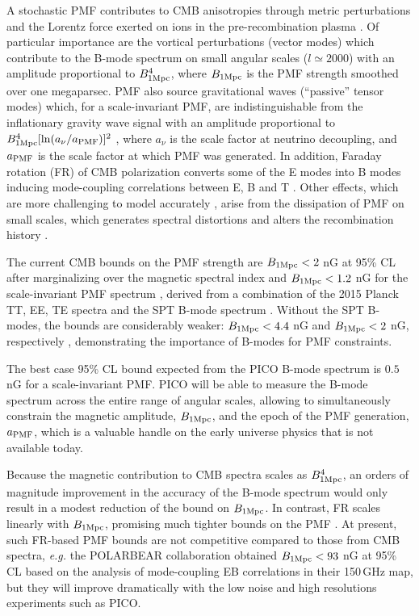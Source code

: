 \documentclass[article,aps,nofootinbib]{revtex4}
\begin{document}
A stochastic PMF contributes to CMB anisotropies through metric perturbations and the Lorentz force exerted on ions in the pre-recombination plasma \cite{Mack:2001gc,Lewis:2004ef,Finelli:2008xh,Paoletti:2008ck,Shaw:2009nf}. Of particular importance are the vortical perturbations (vector modes) which contribute to the B-mode spectrum \cite{Subramanian:1997gi} on small angular scales  ($l \simeq 2000$) with an amplitude proportional to $B^4_{1\rm{Mpc}}$, where $B_{1\rm{Mpc}}$ is the PMF strength smoothed over one megaparsec. PMF also source gravitational waves (``passive'' tensor modes) which, for a scale-invariant PMF, are indistinguishable from the inflationary gravity wave signal with an amplitude proportional to $B^4_{1\rm{Mpc}} [\ln(a_\nu / a_{\rm{PMF}})]^2$ \cite{Lewis:2004ef}, where $a_\nu$ is the scale factor at neutrino decoupling, and $a_{\rm{PMF}}$ is the scale factor at which PMF was generated. In addition, Faraday rotation (FR) of CMB polarization converts some of the E modes into B modes \cite{Kosowsky:1996yc,Pogosian:2011qv} inducing mode-coupling correlations between E, B and T \cite{Kamionkowski:2008fp,Gluscevic:2009mm,Gluscevic:2012me,Pogosian:2013dya}. Other effects, which are more challenging to model accurately \cite{Chluba:2015lpa}, arise from the dissipation of PMF on small scales, which generates spectral distortions and alters the recombination history \cite{Jedamzik:2013gua,Kunze:2014eka}.

The current CMB bounds on the PMF strength are $B_{\rm 1Mpc}<2$ nG at 95\% CL after marginalizing over the magnetic spectral index and $B_{\rm 1Mpc}<1.2$ nG for the scale-invariant PMF spectrum \cite{Zucca:2016iur}, derived from a combination of the 2015 Planck TT, EE, TE spectra \cite{Adam:2015rua} and the SPT B-mode spectrum \cite{Keisler:2015hfa}. Without the SPT B-modes, the bounds are considerably weaker: $B_{\rm 1Mpc}<4.4$ nG and $B_{\rm 1Mpc}<2$ nG, respectively \cite{Ade:2015cva,Zucca:2016iur}, demonstrating the importance of B-modes for PMF constraints.

The best case 95\% CL bound expected from the PICO B-mode spectrum is $0.5$ nG for a scale-invariant PMF. PICO will be able to measure the B-mode spectrum across the entire range of angular scales, allowing to simultaneously constrain the magnetic amplitude, $B_{1\rm{Mpc}}$, and the epoch of the PMF generation, $a_{\rm{PMF}}$, which is a valuable handle on the early universe physics that is not available today.

Because the magnetic contribution to CMB spectra scales as $B^4_{1\rm{Mpc}}$, an orders of magnitude improvement in the accuracy of the B-mode spectrum would only result in a modest reduction of the bound on $B_{1\rm{Mpc}}$. In contrast, FR scales linearly with $B_{1\rm{Mpc}}$, promising much tighter bounds on the PMF \cite{Pogosian:2018vfr}. At present, such FR-based PMF bounds are not competitive compared to those from CMB spectra, {\it e.g.} the POLARBEAR collaboration obtained $B_{1\rm{Mpc}} < 93$ nG at 95\% CL \cite{Ade:2015cao} based on the analysis of mode-coupling EB correlations in their 150\,GHz map, but they will improve dramatically with the low noise and high resolutions experiments such as PICO.
\end{document}
